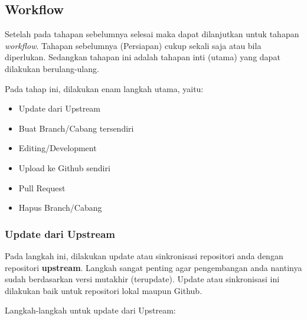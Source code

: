 \documentclass[12pt]{article}
\begin{document}
	\subsection{Workflow}
	
	Setelah pada tahapan sebelumnya selesai maka dapat dilanjutkan untuk tahapan \textit{workflow}.
	Tahapan sebelumnya (Persiapan) cukup sekali saja atau bila diperlukan.
	Sedangkan tahapan ini adalah tahapan inti (utama) yang dapat dilakukan berulang-ulang.
	
	Pada tahap ini, dilakukan enam langkah utama, yaitu:
	\begin{itemize}
		\item Update dari Upstream
		\item Buat Branch/Cabang tersendiri
		\item Editing/Development
		\item Upload ke Github sendiri
		\item Pull Request
		\item Hapus Branch/Cabang
	\end{itemize}

	\subsubsection{Update dari Upstream}
	
	Pada langkah ini, dilakukan update atau sinkronisasi repositori anda dengan repositori \textbf{upstream}.
	Langkah sangat penting agar pengembangan anda nantinya sudah berdasarkan versi mutakhir (terupdate).
	Update atau sinkronisasi ini dilakukan baik untuk repositori lokal maupun Github.
	
	Langkah-langkah untuk update dari Upstream:
	
\end{document}
